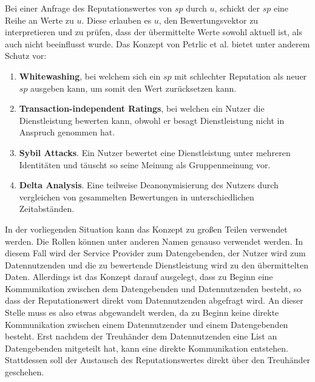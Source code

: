 \documentclass[11pt,a4paper]{scrreprt}
\begin{document}
Bei einer Anfrage des Reputationswertes von $sp$ durch $u$, schickt der $sp$ eine Reihe an Werte zu $u$. Diese erlauben es $u$, den Bewertungsvektor zu interpretieren und zu prüfen, dass der übermittelte Werte sowohl aktuell ist, als auch nicht beeinflusst wurde. 
Das Konzept von Petrlic et al. bietet unter anderem Schutz vor: 
\begin{enumerate}
    \item \textbf{Whitewashing}, bei welchem sich ein $sp$ mit schlechter Reputation als neuer $sp$ ausgeben kann, um somit den Wert zurücksetzen kann.
    \item \textbf{Transaction-independent Ratings}, bei welchen ein Nutzer die Dienstleistung bewerten kann, obwohl er besagt Dienstleistung nicht in Anspruch genommen hat.
    \item \textbf{Sybil Attacks}. Ein Nutzer bewertet eine Dienstleistung unter mehreren Identitäten und täuscht so seine Meinung als Gruppenmeinung vor.
    \item \textbf{Delta Analysis}. Eine teilweise Deanonymisierung des Nutzers durch vergleichen von gesammelten Bewertungen in unterschiedlichen Zeitabständen.
\end{enumerate} 
In der vorliegenden Situation kann das Konzept zu großen Teilen verwendet werden. Die Rollen können unter anderen Namen genauso verwendet werden. In diesem Fall wird der Service Provider zum Datengebenden, der Nutzer wird zum Datennutzenden und die zu bewertende Dienstleistung wird zu den übermittelten Daten. Allerdings ist das Konzept darauf ausgelegt, dass zu Beginn eine Kommunikation zwischen dem Datengebenden und Datennutzenden besteht, so dass der Reputationswert direkt vom Datennutzenden abgefragt wird. An dieser Stelle muss es also etwas abgewandelt werden, da zu Beginn keine direkte Kommunikation zwischen einem Datennutzender und einem Datengebenden besteht. Erst nachdem der Treuhänder dem Datennutzenden eine List an Datengebenden mitgeteilt hat, kann eine direkte Kommunikation entstehen. Stattdessen soll der Austausch des Reputationswertes  direkt über den Treuhänder geschehen.
\end{document}
